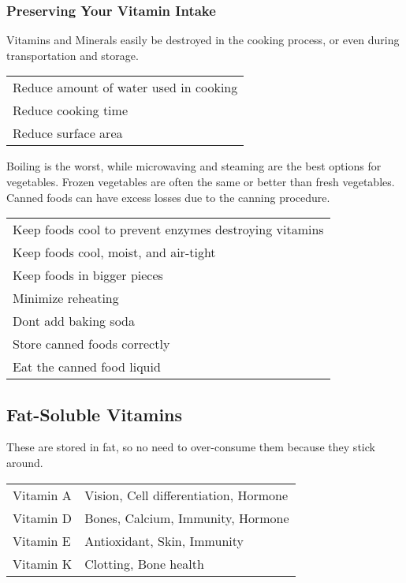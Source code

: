 \documentclass[letterpaper, 11pt]{article}
\begin{document}
\subsubsection{Preserving Your Vitamin Intake}
\label{sec:org53dd59b}
Vitamins and Minerals easily be destroyed in the cooking process, or even during transportation and storage.\\
\begin{center}
\begin{tabular}{l}
Reduce amount of water used in cooking\\
Reduce cooking time\\
Reduce surface area\\
\end{tabular}
\end{center}
Boiling is the worst, while microwaving and steaming are the best options for vegetables. Frozen vegetables are often the same or better than fresh vegetables. Canned foods can have excess losses due to the canning procedure.\\
\begin{center}
\begin{tabular}{l}
Keep foods cool to prevent enzymes destroying vitamins\\
Keep foods cool, moist, and air-tight\\
Keep foods in bigger pieces\\
Minimize reheating\\
Dont add baking soda\\
Store canned foods correctly\\
Eat the canned food liquid\\
\end{tabular}
\end{center}
\subsection{Fat-Soluble Vitamins}
\label{sec:org3f53d94}
These are stored in fat, so no need to over-consume them because they stick around.\\
\begin{center}
\begin{tabular}{ll}
Vitamin A & Vision, Cell differentiation, Hormone\\
Vitamin D & Bones, Calcium, Immunity, Hormone\\
Vitamin E & Antioxidant, Skin, Immunity\\
Vitamin K & Clotting, Bone health\\
\end{tabular}
\end{center}
\end{document}
